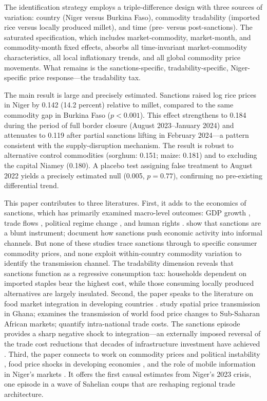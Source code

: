 \documentclass[12pt]{article}
\begin{document}
The identification strategy employs a triple-difference design with three sources of variation: country (Niger versus Burkina Faso), commodity tradability (imported rice versus locally produced millet), and time (pre- versus post-sanctions). The saturated specification, which includes market-commodity, market-month, and commodity-month fixed effects, absorbs all time-invariant market-commodity characteristics, all local inflationary trends, and all global commodity price movements. What remains is the sanctions-specific, tradability-specific, Niger-specific price response---the tradability tax.

The main result is large and precisely estimated. Sanctions raised log rice prices in Niger by 0.142 (14.2 percent) relative to millet, compared to the same commodity gap in Burkina Faso ($p < 0.001$). This effect strengthens to 0.184 during the period of full border closure (August 2023--January 2024) and attenuates to 0.119 after partial sanctions lifting in February 2024---a pattern consistent with the supply-disruption mechanism. The result is robust to alternative control commodities (sorghum: 0.151; maize: 0.181) and to excluding the capital Niamey (0.180). A placebo test assigning false treatment to August 2022 yields a precisely estimated null (0.005, $p = 0.77$), confirming no pre-existing differential trend.

This paper contributes to three literatures. First, it adds to the economics of sanctions, which has primarily examined macro-level outcomes: GDP growth \citep{neuenkirch2015}, trade flows \citep{felbermayr2020}, political regime change \citep{marinov2005}, and human rights \citep{peksen2009}. \citet{alenburgham2007} show that sanctions are a blunt instrument; \citet{earlyetal2017} document how sanctions push economic activity into informal channels. But none of these studies trace sanctions through to specific consumer commodity prices, and none exploit within-country commodity variation to identify the transmission channel. The tradability dimension reveals that sanctions function as a regressive consumption tax: households dependent on imported staples bear the highest cost, while those consuming locally produced alternatives are largely insulated. Second, the paper speaks to the literature on food market integration in developing countries \citep{fackler2001,aker2010,bergquist2020}. \citet{badiane2000} study spatial price transmission in Ghana; \citet{minot2011} examines the transmission of world food price changes to Sub-Saharan African markets; \citet{atkin2018} quantify intra-national trade costs. The sanctions episode provides a sharp negative shock to integration---an externally imposed reversal of the trade cost reductions that decades of infrastructure investment have achieved \citep{brunelli2023}. Third, the paper connects to work on commodity prices and political instability \citep{arezki2014}, food price shocks in developing economies \citep{dillon2016,giordani2016}, and the role of mobile information in Niger's markets \citep{aker2011}. It offers the first causal estimates from Niger's 2023 crisis, one episode in a wave of Sahelian coups that are reshaping regional trade architecture.
\end{document}
